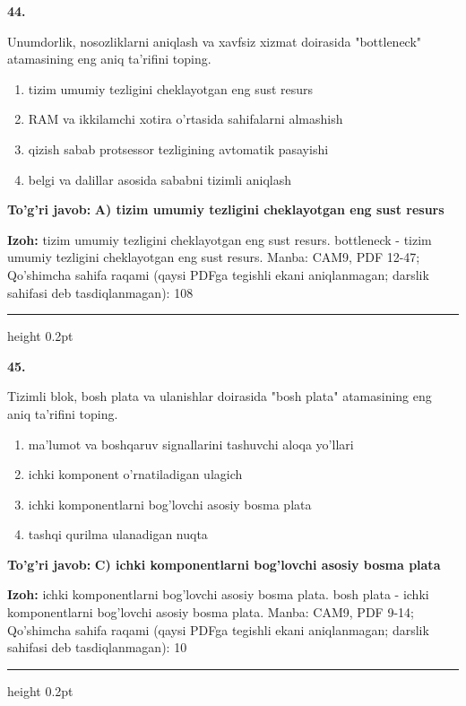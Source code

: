 \documentclass[10pt,a4paper]{article}
\begin{document}
{\bfseries\sffamily\color{ink} 44.}
\par
Unumdorlik, nosozliklarni aniqlash va xavfsiz xizmat doirasida "bottleneck" atamasining eng aniq ta'rifini toping.
\begin{enumerate}[label=\Alph*),leftmargin=9mm]
\item tizim umumiy tezligini cheklayotgan eng sust resurs
\item RAM va ikkilamchi xotira o'rtasida sahifalarni almashish
\item qizish sabab protsessor tezligining avtomatik pasayishi
\item belgi va dalillar asosida sababni tizimli aniqlash
\end{enumerate}
\begin{tcolorbox}[enhanced,breakable,colback=teal!4,colframe=teal!60!black,boxrule=0.45pt,arc=1.2mm,left=2.7mm,right=2.7mm,top=1.8mm,bottom=1.8mm,before skip=2mm,after skip=2mm]
{\bfseries\sffamily\color{teal}To'g'ri javob:} \textbf{A) tizim umumiy tezligini cheklayotgan eng sust resurs}
\par\smallskip
{\bfseries Izoh:} tizim umumiy tezligini cheklayotgan eng sust resurs. bottleneck - tizim umumiy tezligini cheklayotgan eng sust resurs. Manba: CAM9, PDF 12-47; Qo'shimcha sahifa raqami (qaysi PDFga tegishli ekani aniqlanmagan; darslik sahifasi deb tasdiqlanmagan): 108
\end{tcolorbox}
\vspace{2mm}\hrule height 0.2pt\vspace{3mm}

{\bfseries\sffamily\color{ink} 45.}
\par
Tizimli blok, bosh plata va ulanishlar doirasida "bosh plata" atamasining eng aniq ta'rifini toping.
\begin{enumerate}[label=\Alph*),leftmargin=9mm]
\item ma'lumot va boshqaruv signallarini tashuvchi aloqa yo'llari
\item ichki komponent o'rnatiladigan ulagich
\item ichki komponentlarni bog'lovchi asosiy bosma plata
\item tashqi qurilma ulanadigan nuqta
\end{enumerate}
\begin{tcolorbox}[enhanced,breakable,colback=teal!4,colframe=teal!60!black,boxrule=0.45pt,arc=1.2mm,left=2.7mm,right=2.7mm,top=1.8mm,bottom=1.8mm,before skip=2mm,after skip=2mm]
{\bfseries\sffamily\color{teal}To'g'ri javob:} \textbf{C) ichki komponentlarni bog'lovchi asosiy bosma plata}
\par\smallskip
{\bfseries Izoh:} ichki komponentlarni bog'lovchi asosiy bosma plata. bosh plata - ichki komponentlarni bog'lovchi asosiy bosma plata. Manba: CAM9, PDF 9-14; Qo'shimcha sahifa raqami (qaysi PDFga tegishli ekani aniqlanmagan; darslik sahifasi deb tasdiqlanmagan): 10
\end{tcolorbox}
\vspace{2mm}\hrule height 0.2pt\vspace{3mm}
\end{document}
